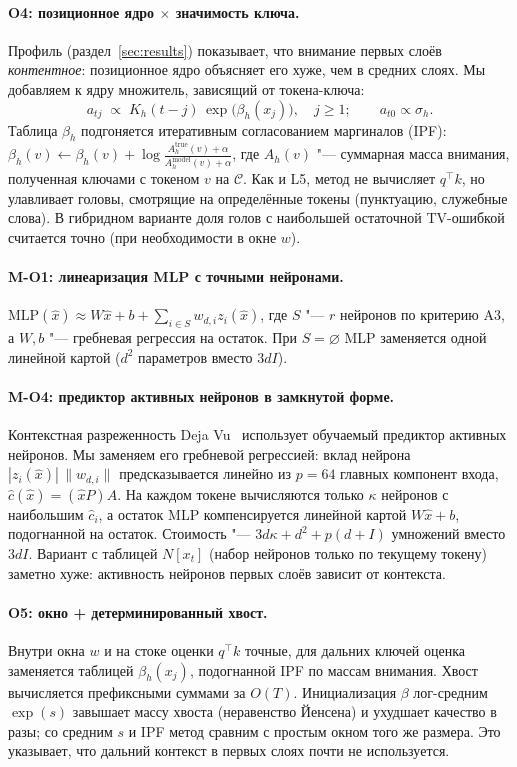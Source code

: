 \paragraph{O4: позиционное ядро $\times$ значимость ключа.}
Профиль (раздел~\ref{sec:results}) показывает, что внимание первых слоёв
\emph{контентное}: позиционное ядро объясняет его хуже, чем в средних
слоях. Мы добавляем к ядру множитель, зависящий от токена-ключа:
\[
  a_{tj}\;\propto\;K_h(t-j)\,\exp\bigl(\beta_h(x_j)\bigr),\quad j\ge1;\qquad
  a_{t0}\propto\sigma_h .
\]
Таблица $\beta_h$ подгоняется итеративным согласованием маргиналов
(IPF): $\beta_h(v)\leftarrow\beta_h(v)+\log\frac{A^{\mathrm{true}}_h(v)+\alpha}{A^{\mathrm{model}}_h(v)+\alpha}$,
где $A_h(v)$ "--- суммарная масса внимания, полученная ключами с токеном
$v$ на $\mathcal C$. Как и L5, метод не вычисляет $q^\top k$, но
улавливает головы, смотрящие на определённые токены (пунктуацию,
служебные слова). В гибридном варианте доля голов с наибольшей
остаточной TV-ошибкой считается точно (при необходимости в окне $w$).

\paragraph{M-O1: линеаризация MLP с точными нейронами.}
$\mathrm{MLP}(\hat x)\approx W\hat x+b+\sum_{i\in S}w_{d,i}z_i(\hat x)$,
где $S$ "--- $r$ нейронов по критерию A3, а $W,b$ "--- гребневая
регрессия на остаток. При $S=\varnothing$ MLP заменяется одной
линейной картой ($d^2$ параметров вместо $3dI$).

\paragraph{M-O4: предиктор активных нейронов в замкнутой форме.}
Контекстная разреженность Deja Vu~\cite{liu2023dejavu} использует
обучаемый предиктор активных нейронов. Мы заменяем его гребневой
регрессией: вклад нейрона $|z_i(\hat x)|\,\|w_{d,i}\|$ предсказывается
линейно из $p=64$ главных компонент входа, $\widehat{c}(\hat x)=(\hat xP)A$.
На каждом токене вычисляются только $\kappa$ нейронов с наибольшим
$\widehat c_i$, а остаток MLP компенсируется линейной картой $W\hat x+b$,
подогнанной на остаток. Стоимость "--- $3d\kappa+d^2+p(d+I)$ умножений
вместо $3dI$. Вариант с таблицей $N[x_t]$ (набор нейронов только по
текущему токену) заметно хуже: активность нейронов первых слоёв
зависит от контекста.

\paragraph{O5: окно + детерминированный хвост.}
Внутри окна $w$ и на стоке оценки $q^\top k$ точные, для дальних ключей
оценка заменяется таблицей $\beta_h(x_j)$, подогнанной IPF по массам
внимания. Хвост вычисляется префиксными суммами за $O(T)$.
Инициализация $\beta$ лог-средним $\exp(s)$ завышает массу хвоста
(неравенство Йенсена) и ухудшает качество в разы; со средним $s$ и IPF
метод сравним с простым окном того же размера. Это указывает, что
дальний контекст в первых слоях почти не используется.

